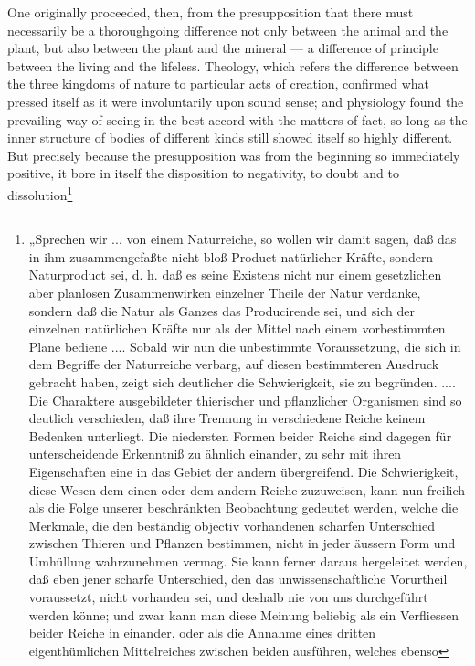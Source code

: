 \documentclass[12pt,a4paper]{book}
\begin{document}
\setcounter{footnote}{0}
One originally proceeded, then, from the presupposition that there must
necessarily be a thoroughgoing difference not only between the animal and the
plant, but also between the plant and the mineral --- a difference of principle
between the living and the lifeless. Theology, which refers the difference
between the three kingdoms of nature to particular acts of creation, confirmed
what pressed itself as it were involuntarily upon sound sense; and physiology
found the prevailing way of seeing in the best accord with the matters of fact,
so long as the inner structure of bodies of different kinds still showed itself
so highly different. But precisely because the presupposition was from the
beginning so immediately positive, it bore in itself the disposition to
negativity, to doubt and to dissolution\footnote{„Sprechen wir ... von einem Naturreiche, so wollen wir damit
sagen, daß das in ihm zusammengefaßte nicht bloß Product natürlicher
Kräfte, sondern Naturproduct sei, d. h. daß es seine Existens nicht nur
einem gesetzlichen aber planlosen Zusammenwirken einzelner Theile der
Natur verdanke, sondern daß die Natur als Ganzes das Producirende sei, und
sich der einzelnen natürlichen Kräfte nur als der Mittel nach einem
vorbestimmten Plane bediene .... Sobald wir nun die unbestimmte
Voraussetzung, die sich in dem Begriffe der Naturreiche verbarg, auf
diesen bestimmteren Ausdruck gebracht haben, zeigt sich deutlicher die
Schwierigkeit, sie zu begründen. .... Die Charaktere ausgebildeter
thierischer und pflanzlicher Organismen sind so deutlich verschieden, daß
ihre Trennung in verschiedene Reiche keinem Bedenken unterliegt. Die
niedersten Formen beider Reiche sind dagegen für unterscheidende
Erkenntniß zu ähnlich einander, zu sehr mit ihren Eigenschaften eine in
das Gebiet der andern übergreifend. Die Schwierigkeit, diese Wesen dem
einen oder dem andern Reiche zuzuweisen, kann nun freilich als die Folge
unserer beschränkten Beobachtung gedeutet werden, welche die Merkmale,
die den beständig objectiv vorhandenen scharfen Unterschied zwischen
Thieren und Pflanzen bestimmen, nicht in jeder äussern Form und Umhüllung
wahrzunehmen vermag. Sie kann ferner daraus hergeleitet werden, daß eben
jener scharfe Unterschied, den das unwissenschaftliche Vorurtheil
voraussetzt, nicht vorhanden sei, und deshalb nie von uns durchgeführt
werden könne; und zwar kann man diese Meinung beliebig als ein
Verfliessen beider Reiche in einander, oder als die Annahme eines dritten
eigenthümlichen Mittelreiches zwischen beiden ausführen, welches ebenso
}
\end{document}

